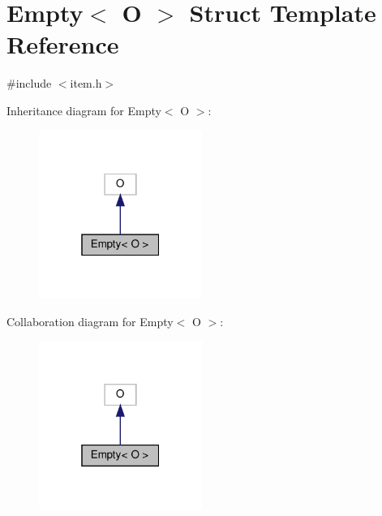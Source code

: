 \hypertarget{structEmpty}{}\section{Empty$<$ O $>$ Struct Template Reference}
\label{structEmpty}


{\ttfamily \#include $<$item.\+h$>$}



Inheritance diagram for Empty$<$ O $>$\+:\nopagebreak
\begin{figure}[H]
\begin{center}
\leavevmode
\includegraphics[width=151pt]{structEmpty__inherit__graph}
\end{center}
\end{figure}


Collaboration diagram for Empty$<$ O $>$\+:\nopagebreak
\begin{figure}[H]
\begin{center}
\leavevmode
\includegraphics[width=151pt]{structEmpty__coll__graph}
\end{center}
\end{figure}

